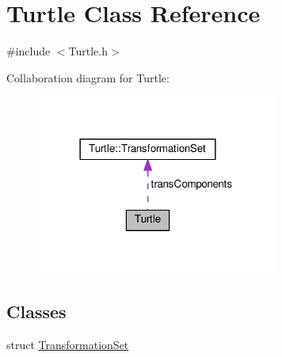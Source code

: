 \hypertarget{class_turtle}{}\section{Turtle Class Reference}
\label{class_turtle}


{\ttfamily \#include $<$Turtle.\+h$>$}



Collaboration diagram for Turtle\+:\nopagebreak
\begin{figure}[H]
\begin{center}
\leavevmode
\includegraphics[width=225pt]{class_turtle__coll__graph}
\end{center}
\end{figure}
\subsection*{Classes}
\begin{DoxyCompactItemize}
\item 
struct \hyperlink{struct_turtle_1_1_transformation_set}{Transformation\+Set}
\end{DoxyCompactItemize}
